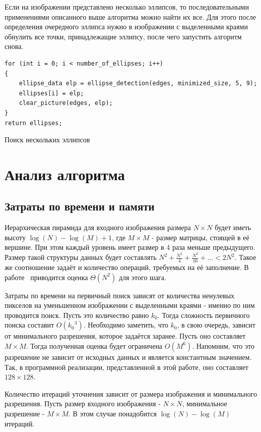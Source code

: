 Если на изображении представлено несколько эллипсов, то последовательными применениями описанного выше алгоритма можно найти их все. 
Для этого после определения очередного эллипса нужно в изображении с выделенными краями обнулить все точки, принадлежащие эллипсу, после чего запустить алгоритм снова.

\begin{ListingEnv}[H]
\begin{lstlisting}
for (int i = 0; i < number_of_ellipses; i++)
{
    ellipse_data elp = ellipse_detection(edges, minimized_size, 5, 9);
    ellipses[i] = elp;
    clear_picture(edges, elp);
}
return ellipses;
\end{lstlisting}
\caption{Поиск нескольких эллипсов}
\label{list:several_ellipses}
\end{ListingEnv}

\section{Анализ алгоритма}
\subsection{Затраты по времени и памяти}
Иерархическая пирамида для входного изображения размера $N \times N$ будет иметь высоту \(\log(N) - \log(M) + 1\), где \(M \times M\) - размер матрицы, стоящей в её вершине. 
При этом каждый уровень имеет размер в 4 раза меньше предыдущего. Размер такой структуры данных будет составлять \(N^2 + \frac{N^2}{4} + \frac{N^2}{16} + ... < 2N^2\).
Такое же соотношение задаёт и количество операций, требуемых на её заполнение. В работе~\autocite{Chien} приводится оценка \(\Theta(N^2)\) для этого шага.

Затраты по времени на первичный поиск зависят от количества ненулевых пикселов на уменьшенном изображении с выделенными краями - именно по ним проводится поиск.
Пусть это количество равно \(k_0\). Тогда сложность первичного поиска составит \(O({k_0}^3)\). 
Необходимо заметить, что \(k_0\), в свою очередь, зависит от минимального разрешения, которое задаётся заранее. Пусть оно составляет $M \times M$.
Тогда полученная оценка будет ограничена \(O(M^6)\). Напомним, что это разрешение не зависит от исходных данных и является константным значением. 
Так, в программной реализации, представленной в этой работе, оно составляет \(128 \times 128\).

Количество итераций уточнения зависит от размера изображения и минимального разрешения. Пусть размер входного изображения - \(N \times N\), минимальное разрешение - \(M \times M\).
В этом случае понадобится \(\log(N) - \log(M)\) итераций.

